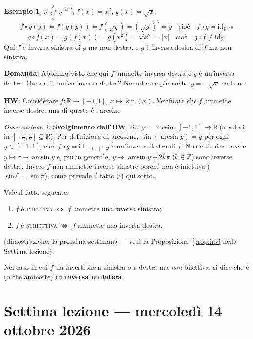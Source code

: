 \documentclass[11pt,a4paper]{article}
\newcommand{\Z}{\mathbb{Z}}
\newcommand{\R}{\mathbb{R}}
\newcommand{\id}{\mathrm{id}}
\theoremstyle{definition}
\newtheorem{esempio}[definizione]{Esempio}
\theoremstyle{plain}
\theoremstyle{remark}
\newtheorem*{osservazione}{Osservazione}
\begin{document}
\begin{esempio}
$\R\underset{g}{\overset{f}{\rightleftarrows}}\R^{\ge0}$, \quad $f(x)=x^2$, \quad $g(x)=\sqrt{x}$.
\[
f\circ g(y)=f(g(y))=f(\sqrt{y})=(\sqrt{y})^2=y\quad\text{cio\`e}\quad{f\circ g=\id_{\R^{\ge0}}}
\]
\[
g\circ f(x)=g(f(x))=g(x^2)=\sqrt{x^2}=|x|\quad\text{cio\`e}\quad g\circ f\neq\id_\R.
\]
Qui $f$ \`e inversa sinistra di $g$ ma non destra, e $g$ \`e inversa destra di $f$ ma non sinistra.
\end{esempio}

\textbf{Domanda:} Abbiamo visto che qui $f$ ammette inversa destra e $g$ \`e un'inversa destra. Questa \`e l'unica inversa destra? No: ad esempio anche $g=-\sqrt{x}$ va bene.

\textbf{HW:} Considerare $f\colon\R\to[-1,1]$, $x\mapsto\sin(x)$. Verificare che $f$ ammette inverse destre: una di queste \`e l'arcsin.

\begin{osservazione}
\textbf{Svolgimento dell'HW}. 
Sia $g=\arcsin\colon[-1,1]\to\R$ (a valori in $[-\frac\pi2,\frac\pi2]\subseteq\R$). Per definizione di arcoseno, $\sin(\arcsin y)=y$ per ogni $y\in[-1,1]$, cio\`e $f\circ g=\id_{[-1,1]}$: $g$ \`e un'inversa destra di $f$. Non \`e l'unica: anche $y\mapsto\pi-\arcsin y$ e, pi\`u in generale, $y\mapsto\arcsin y+2k\pi$ ($k\in\Z$) sono inverse destre. Invece $f$ non ammette inverse sinistre perch\'e non \`e iniettiva ($\sin0=\sin\pi$), come prevede il fatto (i) qui sotto.
\end{osservazione}

Vale il fatto seguente:
\begin{enumerate}[label=(\roman*)]
\item $f$ \`e \textsc{iniettiva} $\iff$ $f$ ammette una inversa sinistra;
\item $f$ \`e \textsc{suriettiva} $\iff$ $f$ ammette una inversa destra.
\end{enumerate}
(dimostrazione: la prossima settimana --- vedi la Proposizione~\ref{prop:inv} nella Settima lezione).

Nel caso in cui $f$ sia invertibile a sinistra o a destra ma \emph{non} biiettiva, si dice che \`e (o che ammette) un'\textbf{inversa unilatera}.

\section{Settima lezione --- mercoled\`i 14 ottobre 2026}
\end{document}
